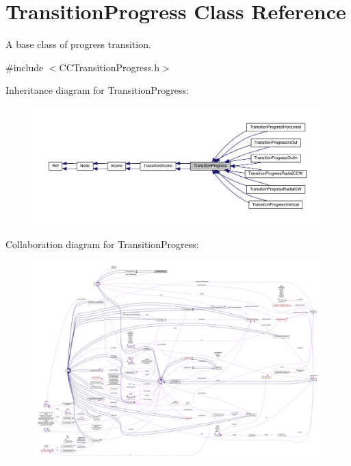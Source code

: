 \hypertarget{classTransitionProgress}{}\section{Transition\+Progress Class Reference}
\label{classTransitionProgress}


A base class of progress transition.  




{\ttfamily \#include $<$C\+C\+Transition\+Progress.\+h$>$}



Inheritance diagram for Transition\+Progress\+:
\nopagebreak
\begin{figure}[H]
\begin{center}
\leavevmode
\includegraphics[width=350pt]{classTransitionProgress__inherit__graph}
\end{center}
\end{figure}


Collaboration diagram for Transition\+Progress\+:
\nopagebreak
\begin{figure}[H]
\begin{center}
\leavevmode
\includegraphics[width=350pt]{classTransitionProgress__coll__graph}
\end{center}
\end{figure}
